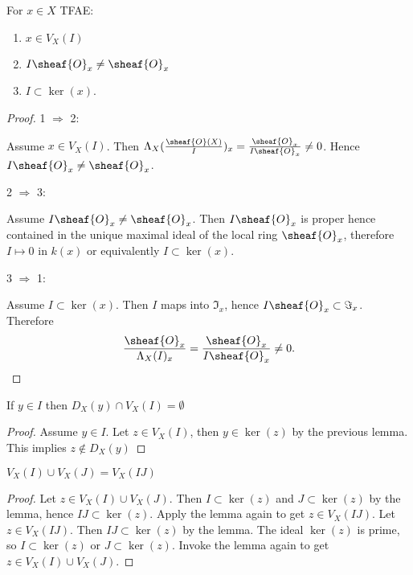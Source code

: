 
\begin{lemma}
For $x\in X$ TFAE:
\begin{enumerate}
\item $x\in V_X(I)$
\item $I\sheaf{O}_x\neq \sheaf{O}_x$ 
\item $I\subset \ker(x)$.
\end{enumerate}
\end{lemma}
\begin{proof}
1 $\Rightarrow$ 2:

Assume $x\in V_X(I)$. 
Then $\Lambda_X(\frac{\sheaf{O}(X)}{I})_x = \frac{\sheaf{O}_x}{I\sheaf{O}_x} \neq 0$. 
Hence $I\sheaf{O}_x \neq \sheaf{O}_x$.

2 $\Rightarrow$ 3: 

Assume $I\sheaf{O}_x\neq \sheaf{O}_x$. 
Then $I\sheaf{O}_x$ is proper hence contained in the unique maximal ideal of the local ring $\sheaf{O}_x$, 
therefore $I\mapsto 0$ in $k(x)$ or equivalently $I\subset \ker(x)$.

3 $\Rightarrow$ 1:

Assume $I \subset \ker(x)$. Then $I$ maps into $\Im_x$, hence $I\sheaf{O}_x \subset \Im_x$. Therefore 
\[\frac{\sheaf{O}_x}{\Lambda_X(I)_x} = \frac{\sheaf{O}_x}{I\sheaf{O}_x} \neq 0.\]

\end{proof}
\begin{corollary}
If $y\in I$ then $D_X(y)\cap V_X(I)= \emptyset$ 
\end{corollary} 
\begin{proof}
Assume $y\in I$.
Let $z\in V_X(I)$, then $y\in \ker(z)$ by the previous lemma.
This implies $z\not\in D_X(y)$
\end{proof}
\begin{corollary}
$V_X(I)\cup V_X(J) = V_X(IJ)$
\end{corollary}
\begin{proof}
Let $z\in V_X(I)\cup V_X(J)$. Then $I\subset \ker(z)$ and $J\subset \ker(z)$ by the lemma, hence $IJ\subset \ker(z)$.
Apply the lemma again to get $z\in V_X(IJ)$.
Let $z\in V_X(IJ)$. Then $IJ \subset \ker(z)$ by the lemma. The ideal $\ker(z)$ is prime, so $I\subset \ker(z)$ or $J\subset \ker(z)$. Invoke the lemma again to get $z\in V_X(I)\cup V_X(J)$.
\end{proof}
